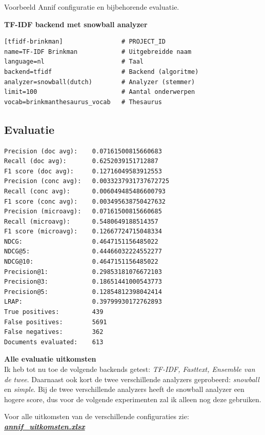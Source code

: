 \documentclass{article}
\begin{document}
Voorbeeld Annif configuratie en bijbehorende evaluatie.

\textbf{TF-IDF backend met snowball analyzer}

\begin{lstlisting}
[tfidf-brinkman]                # PROJECT_ID
name=TF-IDF Brinkman            # Uitgebreidde naam
language=nl                     # Taal
backend=tfidf                   # Backend (algoritme)
analyzer=snowball(dutch)        # Analyzer (stemmer)
limit=100                       # Aantal onderwerpen 
vocab=brinkmanthesaurus_vocab   # Thesaurus
\end{lstlisting}

\subsection{Evaluatie}

\begin{lstlisting}
Precision (doc avg):	0.07161500815660683
Recall (doc avg):   	0.6252039151712887
F1 score (doc avg): 	0.12716049583912553
Precision (conc avg):	0.0033237931737672725
Recall (conc avg):  	0.006049485486600793
F1 score (conc avg):	0.003495638750427632
Precision (microavg):	0.07161500815660685
Recall (microavg):  	0.5480649188514357
F1 score (microavg):	0.12667724715048334
NDCG:               	0.4647151156485022
NDCG@5:             	0.44466032224552277
NDCG@10:            	0.4647151156485022
Precision@1:        	0.29853181076672103
Precision@3:        	0.18651441000543773
Precision@5:        	0.12854812398042414
LRAP:               	0.39799930172762893
True positives:     	439
False positives:    	5691
False negatives:    	362
Documents evaluated:	613
\end{lstlisting}


\noindent
\textbf{Alle evaluatie uitkomsten} \\
Ik heb tot nu toe de volgende backends getest: \textit{TF-IDF, Fasttext, Ensemble van de twee}. Daarnaast ook kort de twee verschillende analyzers geprobeerd: \textit{snowball} en \textit{simple}. Bij de twee verschillende analyzers heeft de snowball analyzer een hogere score, dus voor de volgende experimenten zal ik alleen nog deze gebruiken. \\
\begin{shaded}
Voor alle uitkomsten van de verschillende configuraties zie: \href{https://github.com/KBNLresearch/Annif_data_exp/blob/master/annif_uitkomsten.xlsx}{\textbf{\textit{annif\_uitkomsten.xlsx}}}
\end{shaded}
\end{document}
